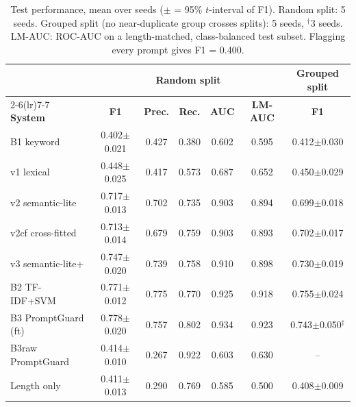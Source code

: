 \begin{table}[t]
\centering
\caption{Test performance, mean over seeds ($\pm$ = 95\% $t$-interval of F1). Random split: 5 seeds. Grouped split (no near-duplicate group crosses splits): 5 seeds, $^\dagger$3 seeds. LM-AUC: ROC-AUC on a length-matched, class-balanced test subset. Flagging every prompt gives F1 = 0.400.}
\label{tab:main}
\small
\begin{tabular}{lcccccc}
\toprule
 & \multicolumn{5}{c}{\textbf{Random split}} & \textbf{Grouped split} \\
\cmidrule(lr){2-6}\cmidrule(lr){7-7}
\textbf{System} & \textbf{F1} & \textbf{Prec.} & \textbf{Rec.} & \textbf{AUC} & \textbf{LM-AUC} & \textbf{F1} \\
\midrule
B1 keyword & 0.402$\pm$0.021 & 0.427 & 0.380 & 0.602 & 0.595 & 0.412$\pm$0.030 \\
v1 lexical & 0.448$\pm$0.025 & 0.417 & 0.573 & 0.687 & 0.652 & 0.450$\pm$0.029 \\
v2 semantic-lite & 0.717$\pm$0.013 & 0.702 & 0.735 & 0.903 & 0.894 & 0.699$\pm$0.018 \\
v2cf cross-fitted & 0.713$\pm$0.014 & 0.679 & 0.759 & 0.903 & 0.893 & 0.702$\pm$0.017 \\
v3 semantic-lite+ & 0.747$\pm$0.020 & 0.739 & 0.758 & 0.910 & 0.898 & 0.730$\pm$0.019 \\
B2 TF-IDF+SVM & 0.771$\pm$0.012 & 0.775 & 0.770 & 0.925 & 0.918 & 0.755$\pm$0.024 \\
B3 PromptGuard (ft) & 0.778$\pm$0.020 & 0.757 & 0.802 & 0.934 & 0.923 & 0.743$\pm$0.050$^\dagger$ \\
B3raw PromptGuard & 0.414$\pm$0.010 & 0.267 & 0.922 & 0.603 & 0.630 & -- \\
Length only & 0.411$\pm$0.013 & 0.290 & 0.769 & 0.585 & 0.500 & 0.408$\pm$0.009 \\
\bottomrule
\end{tabular}
\end{table}
